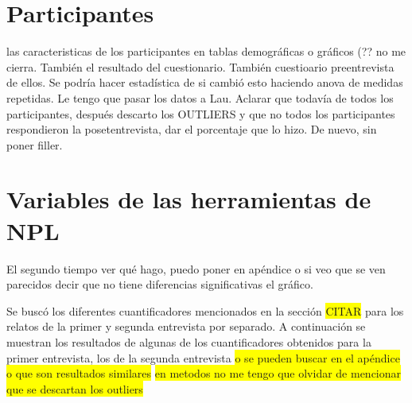 \section{Participantes}
las caracteristicas de los participantes en tablas demográficas o gráficos (?? no me cierra. También el resultado del cuestionario. También cuestioario preentrevista de ellos. Se podría hacer estadística de si cambió esto haciendo anova de medidas repetidas. Le tengo que pasar los datos a Lau. Aclarar que todavía de todos los participantes, después descarto los OUTLIERS y que no todos los participantes respondieron la posetentrevista, dar el porcentaje que lo hizo. De nuevo, sin poner filler.


\section{Variables de las herramientas de NPL}
 
 El segundo tiempo ver qué hago, puedo poner en apéndice o si veo que se ven parecidos decir que no tiene diferencias significativas el gráfico.

Se buscó los diferentes cuantificadores mencionados en la sección \colorbox{yellow}{CITAR} para los relatos de la primer y segunda entrevista por separado. A continuación se muestran los resultados de algunas de los cuantificadores obtenidos para la primer entrevista, los de la segunda entrevista \colorbox{yellow}{o se pueden buscar en el apéndice o que son resultados similares} \colorbox{yellow}{en metodos no me tengo que olvidar de mencionar que se descartan los outliers}

